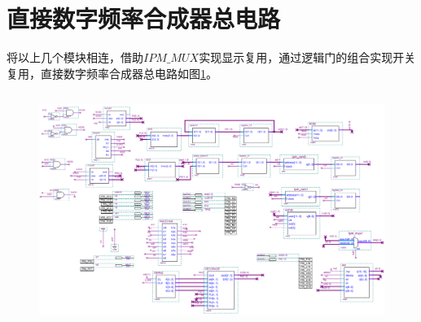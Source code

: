 \documentclass[12pt]{article}
\begin{document}
\section{直接数字频率合成器总电路}
将以上几个模块相连，借助$IPM\_MUX$实现显示复用，通过逻辑门的组合实现开关复用，直接数字频率合成器总电路如图\ref{fig:all-2}。
\begin{lstlisting}[language=VHDL]

\end{lstlisting}
\begin{figure}[hp]
	\centering  
	\includegraphics[width=\textwidth]{picture/all.png} 
	\caption{}
	\label{fig:all-2}   
\end{figure}

\begin{lstlisting}[language=VHDL]
\end{lstlisting}
\end{document}

